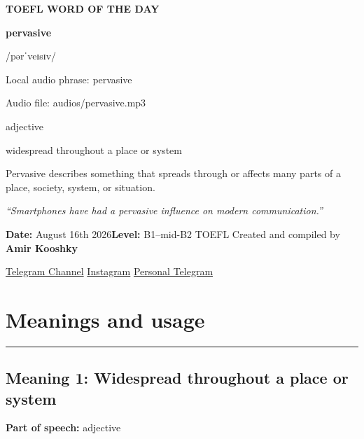 \documentclass[11pt]{article}
\newcommand{\sectionrule}{\par\vspace{-0.5em}\noindent\textcolor{Accent}{\rule{\linewidth}{0.6pt}}\par}
\begin{document}
\begin{center}
{\sffamily\bfseries\color{Accent} TOEFL WORD OF THE DAY\par}
\vspace{8mm}
{\fontsize{42}{48}\selectfont\bfseries pervasive\par}
\vspace{2mm}
{\Large\sffamily\color{Accent} /pərˈveɪsɪv/\par}
\vspace{2mm}
{\small\sffamily Local audio phrase: pervasive\par}
{\small\sffamily Audio file: audios/pervasive.mp3\par}
\vspace{2mm}
{\large\sffamily\color{Muted} adjective\par}
\vspace{5mm}
{\sffamily widespread throughout a place or system\par}
\vspace{6mm}
{\large Pervasive describes something that spreads through or affects many parts of a place, society, system, or situation.\par}
\vspace{6mm}
\begin{minipage}{0.84\textwidth}
\itshape “Smartphones have had a pervasive influence on modern communication.”
\end{minipage}\par
\vspace{10mm}
\textbf{Date:} August 16th 2026\quad\textbullet\quad \textbf{Level:} B1--mid-B2 TOEFL
\vfill
Created and compiled by \textbf{Amir Kooshky}\par
\vspace{2mm}
\href{https://t.me/KooshkyTOEFL}{Telegram Channel}\quad\textbullet\quad
\href{https://www.instagram.com/kooshkytoefl}{Instagram}\quad\textbullet\quad
\href{https://t.me/KooshkyTOEFL\_pv}{Personal Telegram}
\end{center}
\newpage
\tableofcontents
\newpage

\section{Meanings and usage}
\sectionrule
\subsection{Meaning 1: Widespread throughout a place or system}
\textbf{Part of speech:} adjective
\end{document}
